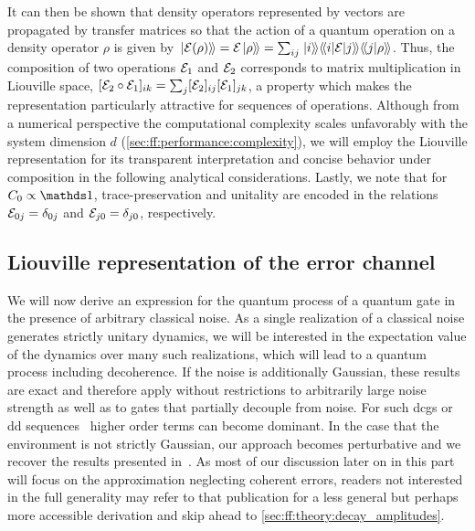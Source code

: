 It can then be shown that density operators represented by vectors are propagated by transfer matrices so that the action of a quantum operation \qp on a density operator $\rho$ is given by $\dket{\qp(\rho)} = \qp\dket{\rho} = \sum_{ij}\dket{i}\dmel{i}{\qp}{j}\dip{j}{\rho}$.
Thus, the composition of two operations $\mathcal{E}_1$ and $\mathcal{E}_2$ corresponds to matrix multiplication in Liouville space, $[\mathcal{E}_2\circ\mathcal{E}_1]_{ik} = \sum_j[\mathcal{E}_2]_{ij}[\mathcal{E}_1]_{jk}$, a property which makes the representation particularly attractive for sequences of operations.
Although from a numerical perspective the computational complexity scales unfavorably with the system dimension $d$ (\cf \cref{sec:ff:performance:complexity}),  we will employ the Liouville representation for its transparent interpretation and concise behavior under composition in the following analytical considerations.
Lastly, we note that for $C_0\propto\eye$, trace-preservation and unitality are encoded in the relations $\mathcal{E}_{0j} = \delta_{0j}$ and $\mathcal{E}_{j0} = \delta_{j0}$, respectively.

\subsection{Liouville representation of the error channel}\label{subsec:ff:theory:transfer_matrix:derivation}
We will now derive an expression for the quantum process of a quantum gate in the presence of arbitrary classical noise.
As a single realization of a classical noise generates strictly unitary dynamics, we will be interested in the expectation value of the dynamics over many such realizations, which will lead to a quantum process including decoherence.
If the noise is additionally Gaussian, these results are exact and therefore apply without restrictions to arbitrarily large noise strength as well as to gates that partially decouple from noise.
For such \glspl{dcg} or \gls{dd} sequences~\cite{Khodjasteh2009,Cywinski2008} higher order terms can become dominant.
In the case that the environment is not strictly Gaussian, our approach becomes perturbative and we recover the results presented in~.
As most of our discussion later on in this part will focus on the approximation neglecting coherent errors, readers not interested in the full generality may refer to that publication for a less general but perhaps more accessible derivation and skip ahead to \cref{sec:ff:theory:decay_amplitudes}.

